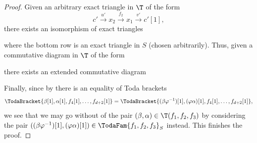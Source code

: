 \documentclass[a4paper]{amsart}
\begin{document}
\begin{proof}
  Given an arbitrary exact triangle in $\T$ of the form
  \[
    c'\xrightarrow{u'}x_2\xrightarrow{f_2}x_1\xrightarrow{v'}c'[1],
  \]
  there exists an isomorphism of exact triangles
  \begin{center}
  \end{center}
  where the bottom row is an exact triangle in $S$ (chosen arbitrarily). Thus,
  given a commutative diagram in $\T$ of the form
  \begin{center}
  \end{center}
  there exists an extended commutative diagram
  \begin{center}
  \end{center}
  Finally, since by  there is an equality of
  Toda brackets
  \[
    \TodaBracket{\beta[1],\alpha[1],f_4[1],\dots,f_{d+2}[1]}=\TodaBracket{(\beta\varphi^{-1})[1],(\varphi\alpha)[1],f_4[1],\dots,f_{d+2}[1]},
  \]
  we see that we may go without of the pair $(\beta,\alpha)\in\T(f_1,f_2,f_3)$
  by considering the pair
  $((\beta\varphi^{-1})[1],(\varphi\alpha)[1])\in\TodaFam{f_1,f_2,f_3}_S$
  instead. This finishes the proof.
\end{proof}
\end{document}
